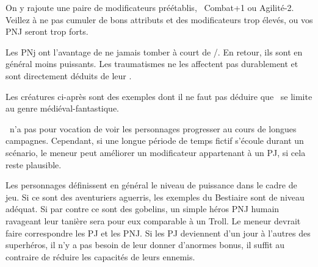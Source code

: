 {		\nipajinTableNSC

		\noindent
		On y rajoute une paire de modificateurs préétablis, \pe\ Combat+1 ou Agilité-2. Veillez à ne pas cumuler de bons attributs et des modificateurs trop élevés, ou vos PNJ seront trop forts.

		Les PNj ont l'avantage de ne jamais tomber à court de \AD/\RD. En retour, ils sont en général moins puissants. Les traumatismes ne les affectent pas durablement et sont directement déduits de leur \HD.


		\noindent
		Les créatures ci-après sont des exemples dont il ne faut pas déduire que \nipajin\ se limite au genre médiéval-fantastique.

		\nipajinTableBestiary


		\noindent
		\nipajin\ n'a pas pour vocation de voir les personnages progresser au cours de longues campagnes. Cependant, si une longue période de temps fictif s'écoule durant un scénario, le meneur peut améliorer un modificateur appartenant à un PJ, si cela reste plausible.

		Les personnages définissent en général le niveau de puissance dans le cadre de jeu. Si ce sont des aventuriers aguerris, les exemples du Bestiaire sont de niveau adéquat. Si par contre ce sont des gobelins, un simple héros PNJ humain ravageant leur tanière sera pour eux comparable à un Troll. Le meneur devrait faire correspondre les PJ et les PNJ. Si les PJ deviennent d'un jour à l'autres des superhéros, il n'y a pas besoin de leur donner d'anormes bonus, il suffit au contraire de réduire les capacités de leurs ennemis.
}
